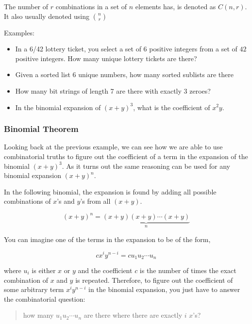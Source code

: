 The number of \textbf{\(r\)} combinations in a set of \textbf{\(n\)}
elements has, is denoted as \textbf{\(C(n,r)\)}. It also usually denoted
using \textbf{\({n\choose r}\)}

Examples:

\begin{itemize}
\tightlist
\item
  In a 6/42 lottery ticket, you select a set of \textbf{\(6\)} positive
  integers from a set of \textbf{\(42\)} positive integers. How many
  unique lottery tickets are there?
\item
  Given a sorted list 6 unique numbers, how many sorted sublists are
  there
\item
  How many bit strings of length 7 are there with exactly 3 zeroes?
\item
  In the binomial expansion of \textbf{\((x+y)^3\)}, what is the
  coefficient of \textbf{\(x^2y\)}.
\end{itemize}

\hypertarget{binomial-theorem}{%
\subsubsection{Binomial Theorem}\label{binomial-theorem}}

Looking back at the previous example, we can see how we are able to use
combinatorial truths to figure out the coefficient of a term in the
expansion of the binomial \textbf{\((x+y)^3\)}. As it turns out the same
reasoning can be used for any binomial expansion \textbf{\((x+y)^n\)}.

In the following binomial, the expansion is found by adding all possible
combinations of \textbf{\(x\)}'s and \textbf{\(y\)}'s from all
\textbf{\((x+y)\)}.

\[
(x+y)^n=\underbrace{(x+y)(x+y)\cdots(x+y)}_n
\]

You can imagine one of the terms in the expansion to be of the form,

\[
cx^iy^{n-i}=cu_1u_2\cdots u_n
\]

where \textbf{\(u_i\)} is either \textbf{\(x\)} or \textbf{\(y\)} and
the coefficient \textbf{\(c\)} is the number of times the exact
combination of \textbf{\(x\)} and \textbf{\(y\)} is repeated. Therefore,
to figure out the coefficient of some arbitrary term
\textbf{\(x^iy^{n-i}\)} in the binomial expansion, you just have to
answer the combinatorial question:

\begin{quote}
how many \textbf{\(u_1u_2\cdots u_n\)} are there where there are exactly
\textbf{\(i\)} \textbf{\(x\)}'s?
\end{quote}

